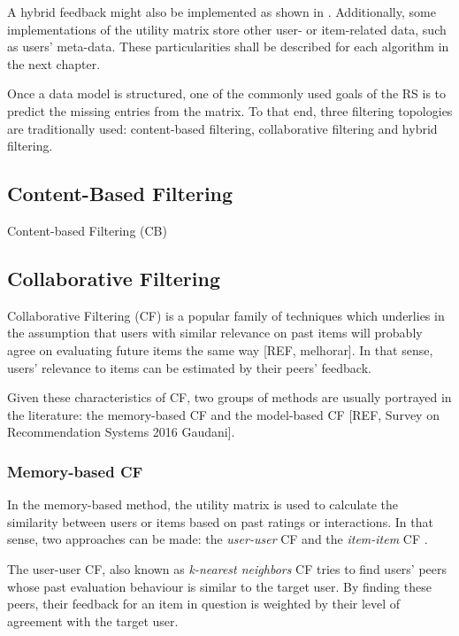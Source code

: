     A hybrid feedback might also be implemented as shown in \cite{2015RSPrinciples}. Additionally, some implementations of the utility matrix store other user- or item-related data, such as users' meta-data. These particularities shall be described for each algorithm in the next chapter. 
    
    Once a data model is structured, one of the commonly used goals of the RS is to predict the missing entries from the matrix. To that end, three filtering topologies are traditionally used: content-based filtering, collaborative filtering and hybrid filtering. 

\subsection{Content-Based Filtering}

Content-based Filtering (CB) 

\subsection{Collaborative Filtering}
\label{sec:CF}

    Collaborative Filtering (CF)  is a popular family of techniques which underlies in the assumption 
    that users with similar relevance on past items will probably agree on evaluating future items 
    the same way [REF, melhorar]. In that sense, users' relevance to items can be estimated by their
    peers' feedback.

    Given these characteristics of CF, two groups of methods are usually portrayed in the literature: 
    the memory-based CF and the model-based CF [REF, Survey on Recommendation Systems 2016 Gaudani]. 

  \subsubsection{Memory-based CF}

    In the memory-based method, the utility matrix is used to calculate the similarity between 
    users or items based on past ratings or interactions. In that sense, two approaches can be made:
    the \textit{user-user} CF and the \textit{item-item} CF \cite{2011ekstrand}. 
    
    The user-user CF, also known as \textit{k-nearest neighbors} CF tries to find users' peers 
    whose past evaluation behaviour is similar to the target user. By finding these peers, their 
    feedback for an item in question is weighted by their level of agreement with the target user.  
    

